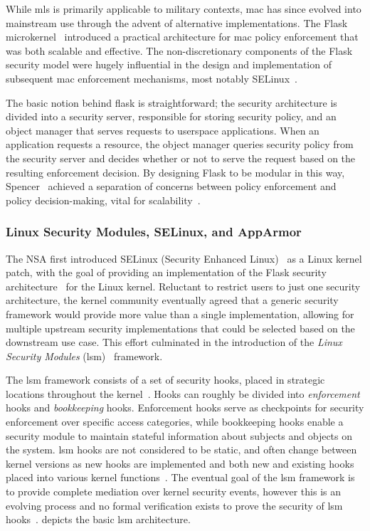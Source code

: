 While \gls{mls} is primarily applicable to military contexts, \gls{mac} has since evolved
into mainstream use through the advent of alternative implementations. The Flask
microkernel~\cite{spencer1999_flask} introduced a practical architecture for \gls{mac}
policy enforcement that was both scalable and effective. The non-discretionary components
of the Flask security model were hugely influential in the design and implementation of
subsequent \gls{mac} enforcement mechanisms, most notably
SELinux~\cite{smalley2001_selinux, loscocco2001_selinux}.

The basic notion behind flask is straightforward; the security architecture is divided
into a security server, responsible for storing security policy, and an object manager that
serves requests to userspace applications. When an application requests a resource, the
object manager queries security policy from the security server and decides whether or not
to serve the request based on the resulting enforcement decision. By designing Flask to be
modular in this way, Spencer \etal~achieved a separation of concerns between policy
enforcement and policy decision-making, vital for scalability~\cite{spencer1999_flask,
smalley2001_selinux, loscocco2001_selinux}.

\subsubsection*{Linux Security Modules, SELinux, and AppArmor}

The NSA first introduced SELinux (Security Enhanced Linux)~\cite{smalley2001_selinux,
loscocco2001_selinux} as a Linux kernel patch, with the goal of providing an
implementation of the Flask security architecture~\cite{spencer1999_flask} for the Linux
kernel. Reluctant to restrict users to just one security architecture, the kernel
community eventually agreed that a generic security framework would provide more value
than a single implementation, allowing for multiple upstream security implementations that
could be selected based on the downstream use case. This effort culminated in the
introduction of the \textit{Linux Security Modules} (\gls{lsm})~\cite{wright2002_lsm} framework.

The \gls{lsm} framework consists of a set of security hooks, placed in strategic locations
throughout the kernel~\cite{wright2002_lsm}. Hooks can roughly be divided into
\textit{enforcement} hooks and \textit{bookkeeping} hooks. Enforcement hooks serve as
checkpoints for security enforcement over specific access categories, while bookkeeping
hooks enable a security module to maintain stateful information about subjects and objects
on the system.  \gls{lsm} hooks are not considered to be static, and often change between
kernel versions as new hooks are implemented and both new and existing hooks placed into
various kernel functions~\cite{zhang2021_lsm_file_overhead}. The eventual goal of the
\gls{lsm} framework is to provide complete mediation over kernel security events, however
this is an evolving process and no formal verification exists to prove the security of
\gls{lsm} hooks~\cite{ganapathy2005_lsm}.  depicts the basic \gls{lsm} architecture.

